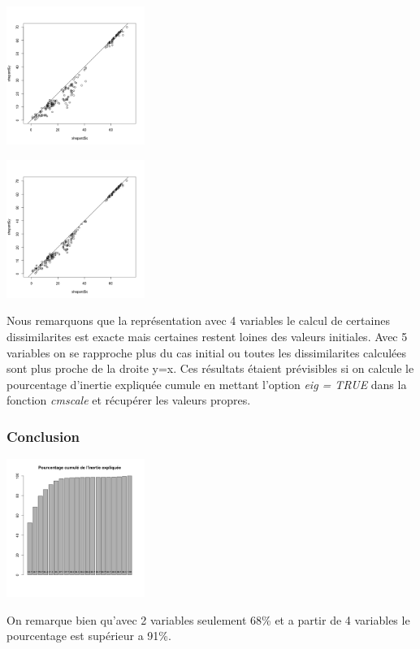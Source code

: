 \documentclass[10pt]{article}
\begin{document}
		\begin{minipage}{.5\textwidth}
		\includegraphics[width=45mm]{Figures/Mutations2_1/shepard4.png}
		\label{fig:shepard4}
	\end{minipage}%
	\hspace{0.02\linewidth}
	\begin{minipage}{.5\textwidth}
		\includegraphics[width=45mm]{Figures/Mutations2_1/shepard5.png}
		\label{fig:shepard5}
	\end{minipage}
	\vspace{0.1mm}

	Nous remarquons que la représentation avec 4 variables le calcul de certaines dissimilarites est exacte mais certaines restent loines des valeurs initiales. Avec 5 variables on se rapproche plus du cas initial ou toutes les dissimilarites calculées sont plus proche de la droite y=x. Ces résultats étaient prévisibles si on calcule le pourcentage d'inertie expliquée cumule en mettant l'option \textit{eig = TRUE} dans la fonction \textit{cmscale} et récupérer les valeurs propres.
	
	\subsubsection{Conclusion}
	\begin{center}
		\includegraphics[width=45mm]{Figures/Mutations2_1/barplot.png}
		\label{fig:mutations_barplot}
		\end{center}
	On remarque bien qu'avec 2 variables seulement 68\%  et a partir de 4 variables le pourcentage est supérieur a 91\%.
\end{document}
